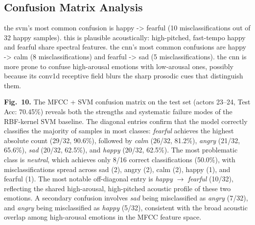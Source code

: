 \documentclass[conference]{IEEEtran}
\begin{document}
{\subsection{Confusion Matrix Analysis}\label{confusion-matrix-analysis}

the svm's most common confusion is happy -\textgreater{} fearful (10
misclassifications out of 32 happy samples). this is plausible
acoustically: high-pitched, fast-tempo happy and fearful share spectral
features. the cnn's most common confusions are happy -\textgreater{}
calm (8 misclassifications) and fearful -\textgreater{} sad (5
misclassifications). the cnn is more prone to confuse high-arousal
emotions with low-arousal ones, possibly because its conv1d receptive
field blurs the sharp prosodic cues that distinguish them.

\textbf{Fig.~10.} The MFCC + SVM confusion matrix on the 
test set (actors 23--24, Test Acc: 70.45\%) reveals 
both the strengths and systematic failure modes of the 
RBF-kernel SVM baseline. The diagonal entries confirm 
that the model correctly classifies the majority of 
samples in most classes: \textit{fearful} achieves the 
highest absolute count (29/32, 90.6\%), followed by 
\textit{calm} (26/32, 81.2\%), \textit{angry} 
(21/32, 65.6\%), \textit{sad} (20/32, 62.5\%), and 
\textit{happy} (20/32, 62.5\%). The most problematic 
class is \textit{neutral}, which achieves only 8/16 
correct classifications (50.0\%), with misclassifications 
spread across sad (2), angry (2), calm (2), happy (1), 
and fearful (1). The most notable off-diagonal entry 
is \textit{happy} $\rightarrow$ \textit{fearful} 
(10/32), reflecting the shared high-arousal, 
high-pitched acoustic profile of these two emotions. 
A secondary confusion involves \textit{sad} being 
misclassified as \textit{angry} (7/32), and 
\textit{angry} being misclassified as \textit{happy} 
(5/32), consistent with the broad acoustic overlap 
among high-arousal emotions in the MFCC feature space.

}
\end{document}

